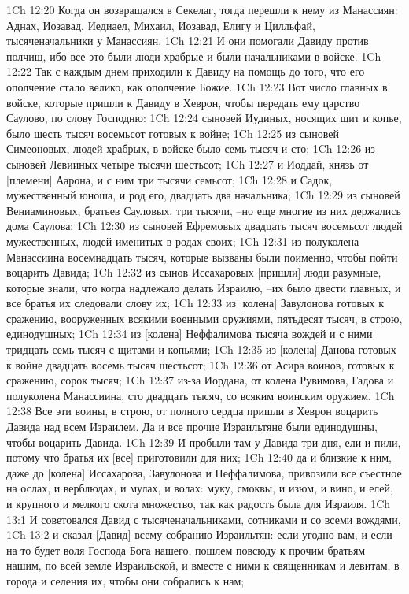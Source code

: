1Ch 12:20  Когда он возвращался в Секелаг, тогда перешли к нему из Манассиян: Аднах, Иозавад, Иедиаел, Михаил, Иозавад, Елигу и Цилльфай, тысяченачальники у Манассиян.
1Ch 12:21  И они помогали Давиду против полчищ, ибо все это были люди храбрые и были начальниками в войске.
1Ch 12:22  Так с каждым днем приходили к Давиду на помощь до того, что его ополчение стало велико, как ополчение Божие.
1Ch 12:23  Вот число главных в войске, которые пришли к Давиду в Хеврон, чтобы передать ему царство Саулово, по слову Господню:
1Ch 12:24  сыновей Иудиных, носящих щит и копье, было шесть тысяч восемьсот готовых к войне;
1Ch 12:25  из сыновей Симеоновых, людей храбрых, в войске было семь тысяч и сто;
1Ch 12:26  из сыновей Левииных четыре тысячи шестьсот;
1Ch 12:27  и Иоддай, князь от [племени] Аарона, и с ним три тысячи семьсот;
1Ch 12:28  и Садок, мужественный юноша, и род его, двадцать два начальника;
1Ch 12:29  из сыновей Вениаминовых, братьев Сауловых, три тысячи, --но еще многие из них держались дома Саулова;
1Ch 12:30  из сыновей Ефремовых двадцать тысяч восемьсот людей мужественных, людей именитых в родах своих;
1Ch 12:31  из полуколена Манассиина восемнадцать тысяч, которые вызваны были поименно, чтобы пойти воцарить Давида;
1Ch 12:32  из сынов Иссахаровых [пришли] люди разумные, которые знали, что когда надлежало делать Израилю, --их было двести главных, и все братья их следовали слову их;
1Ch 12:33  из [колена] Завулонова готовых к сражению, вооруженных всякими военными оружиями, пятьдесят тысяч, в строю, единодушных;
1Ch 12:34  из [колена] Неффалимова тысяча вождей и с ними тридцать семь тысяч с щитами и копьями;
1Ch 12:35  из [колена] Данова готовых к войне двадцать восемь тысяч шестьсот;
1Ch 12:36  от Асира воинов, готовых к сражению, сорок тысяч;
1Ch 12:37  из-за Иордана, от колена Рувимова, Гадова и полуколена Манассиина, сто двадцать тысяч, со всяким воинским оружием.
1Ch 12:38  Все эти воины, в строю, от полного сердца пришли в Хеврон воцарить Давида над всем Израилем. Да и все прочие Израильтяне были единодушны, чтобы воцарить Давида.
1Ch 12:39  И пробыли там у Давида три дня, ели и пили, потому что братья их [все] приготовили для них;
1Ch 12:40  да и близкие к ним, даже до [колена] Иссахарова, Завулонова и Неффалимова, привозили все съестное на ослах, и верблюдах, и мулах, и волах: муку, смоквы, и изюм, и вино, и елей, и крупного и мелкого скота множество, так как радость была для Израиля.
1Ch 13:1  И советовался Давид с тысяченачальниками, сотниками и со всеми вождями,
1Ch 13:2  и сказал [Давид] всему собранию Израильтян: если угодно вам, и если на то будет воля Господа Бога нашего, пошлем повсюду к прочим братьям нашим, по всей земле Израильской, и вместе с ними к священникам и левитам, в города и селения их, чтобы они собрались к нам;
